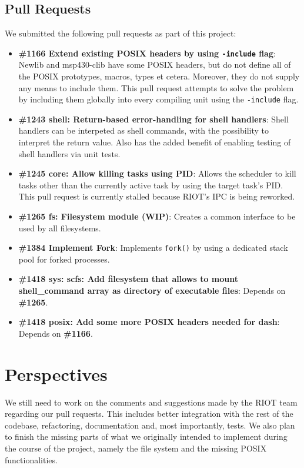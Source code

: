 \documentclass[conference]{IEEEtran}
\begin{document}
\subsection{Pull Requests}
\label{sub:Pull Requests}
We submitted the following pull requests as part of this project:

\begin{itemize}
  \item \textbf{\#1166 Extend existing POSIX headers by using
    \texttt{-include} flag}: Newlib and msp430-clib have some POSIX
    headers, but do not define all of the POSIX prototypes, macros,
    types et cetera.  Moreover, they do not supply any means to include
    them. This pull request attempts to solve the problem by including
    them globally into every compiling unit using the \texttt{-include}
    flag.
  \item \textbf{\#1243 shell: Return-based error-handling for shell
    handlers}: Shell handlers can be interpeted as shell commands, with
    the possibility to interpret the return value. Also has the added
    benefit of enabling testing of shell handlers via unit tests.
  \item \textbf{\#1245 core: Allow killing tasks using PID}: Allows the
    scheduler to kill tasks other than the currently active task by
    using the target task's PID. This pull request is currently stalled
    because RIOT's IPC is being reworked.
  \item \textbf{\#1265 fs: Filesystem module (WIP)}: Creates a common
    interface to be used by all filesystems.
  \item \textbf{\#1384 Implement Fork}: Implements \texttt{fork()} by
    using a dedicated stack pool for forked processes.
  \item \textbf{\#1418 sys: scfs: Add filesystem that allows to mount
    shell\_command array as directory of executable files}: Depends on
    \textbf{\#1265}.
  \item \textbf{\#1418 posix: Add some more POSIX headers needed for dash}: Depends on
    \textbf{\#1166}.
\end{itemize}

\section{Perspectives}
\label{sec:Perspectives}
We still need to work on the comments and suggestions made by the RIOT
team regarding our pull requests. This includes better integration with
the rest of the codebase, refactoring, documentation and, most
importantly, tests. We also plan to finish the missing parts of what we
originally intended to implement during the course of the project,
namely the file system and the missing POSIX functionalities.
\end{document}
